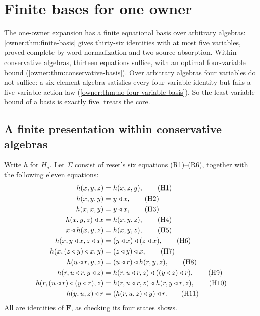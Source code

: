\section{Finite bases for one owner}\label{app:basis}

The one-owner expansion has a finite equational basis over arbitrary
algebras: \cref{owner:thm:finite-basis} gives thirty-six identities with
at most five variables, proved complete by word normalization and two-source
absorption. Within conservative algebras, thirteen equations suffice, with an
optimal four-variable bound (\cref{owner:thm:conservative-basis}). Over
arbitrary algebras four variables do not suffice: a six-element algebra
satisfies every four-variable identity but fails a five-variable action law
(\cref{owner:thm:no-four-variable-basis}). So the least variable bound of a
basis is exactly five.  treats the core.



\subsection{A finite presentation within conservative algebras}

Write $h$ for $H_a$. Let $\Sigma$ consist of reset's six equations
(R1)--(R6), together with the following eleven equations:
\begin{align}
 h(x,y,z)&=h(x,z,y),\tag{H1}\label{owner:eq:H1}\\
 h(x,y,y)&=y\mathbin{\triangleleft} x,\tag{H2}\label{owner:eq:H2}\\
 h(x,x,y)&=y\mathbin{\triangleleft} x,\tag{H3}\label{owner:eq:H3}\\
 h(x,y,z)\mathbin{\triangleleft} x&=h(x,y,z),\tag{H4}\label{owner:eq:H4}\\
 x\mathbin{\triangleleft} h(x,y,z)&=h(x,y,z),\tag{H5}\label{owner:eq:H5}\\
 h(x,y\mathbin{\triangleleft} x,z\mathbin{\triangleleft} x)&=(y\mathbin{\triangleleft} x)\mathbin{\triangleleft}(z\mathbin{\triangleleft} x),\tag{H6}\label{owner:eq:H6}\\
 h(x,(z\mathbin{\triangleleft} y)\mathbin{\triangleleft} x,y)&=(z\mathbin{\triangleleft} y)\mathbin{\triangleleft} x,\tag{H7}\label{owner:eq:H7}\\
 h(u\mathbin{\triangleleft} r,y,z)&=(u\mathbin{\triangleleft} r)\mathbin{\triangleleft} h(r,y,z),\tag{H8}\label{owner:eq:H8}\\
 h(r,u\mathbin{\triangleleft} r,y\mathbin{\triangleleft} z)&=h(r,u\mathbin{\triangleleft} r,z)\mathbin{\triangleleft}((y\mathbin{\triangleleft} z)\mathbin{\triangleleft} r),\tag{H9}\label{owner:eq:H9}\\
 h(r,(u\mathbin{\triangleleft} r)\mathbin{\triangleleft}(y\mathbin{\triangleleft} r),z)
   &=h(r,u\mathbin{\triangleleft} r,z)\mathbin{\triangleleft} h(r,y\mathbin{\triangleleft} r,z),\tag{H10}\label{owner:eq:H10}\\
 h(y,u,z)\mathbin{\triangleleft} r&=(h(r,u,z)\mathbin{\triangleleft} y)\mathbin{\triangleleft} r.\tag{H11}\label{owner:eq:H11}
\end{align}
All are identities of $\mathbf F$, as checking its four states shows.

